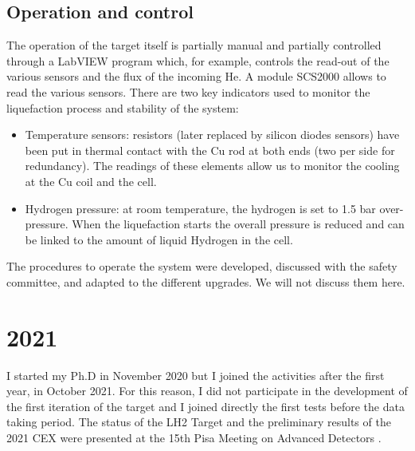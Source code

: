 \begin{refsection}
    \subsection{Operation and control}
        The operation of the target itself is partially manual and partially controlled through a LabVIEW program which, for example, controls the read-out of the various sensors and the flux of the incoming He. 
        A module SCS2000 allows to read the various sensors. 
        There are two key indicators used to monitor the liquefaction process and stability of the system:
    
        \begin{itemize}
            \item Temperature sensors: resistors (later replaced by \lakeshore silicon diodes sensors) have been put in thermal contact with the Cu rod at both ends (two per side for redundancy). 
            The readings of these elements allow us to monitor the cooling at the Cu coil and the cell.
            \item Hydrogen pressure: at room temperature, the hydrogen is set to 1.5 bar over-pressure. When the liquefaction starts the overall pressure is reduced and can be linked to the amount of liquid Hydrogen in the cell. 
        \end{itemize}
        \noindent
        The procedures to operate the system were developed, discussed with the safety committee, and adapted to the different upgrades.
        We will not discuss them here.

\section{2021}
    I started my Ph.D in November 2020 but I joined the activities after the first year, in October 2021. 
    For this reason, I did not participate in the development of the first iteration of the target and I joined directly the first tests before the data taking period.
    The status of the LH2 Target and the preliminary results of the 2021 CEX were presented at the 15th Pisa Meeting on Advanced Detectors \cite{Elba:mio}.


\end{refsection}

